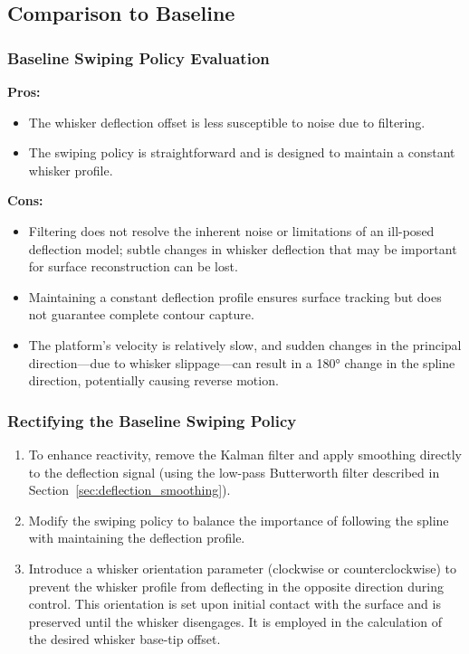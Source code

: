 \subsection{Comparison to Baseline}

\subsubsection{Baseline Swiping Policy Evaluation}

\textbf{Pros:}
\begin{itemize}
    \item The whisker deflection offset is less susceptible to noise due to filtering.
    \item The swiping policy is straightforward and is designed to maintain a constant whisker profile.
\end{itemize}

\textbf{Cons:}
\begin{itemize}
    \item Filtering does not resolve the inherent noise or limitations of an ill-posed deflection model; subtle changes in whisker deflection that may be important for surface reconstruction can be lost.
    \item Maintaining a constant deflection profile ensures surface tracking but does not guarantee complete contour capture.
    \item The platform's velocity is relatively slow, and sudden changes in the principal direction—due to whisker slippage—can result in a 180° change in the spline direction, potentially causing reverse motion.
\end{itemize}

\subsubsection{Rectifying the Baseline Swiping Policy}
\begin{enumerate}
    \item To enhance reactivity, remove the Kalman filter and apply smoothing directly to the deflection signal (using the low-pass Butterworth filter described in Section~\ref{sec:deflection_smoothing}).
    \item Modify the swiping policy to balance the importance of following the spline with maintaining the deflection profile.
    \item Introduce a whisker orientation parameter (clockwise or counterclockwise) to prevent the whisker profile from deflecting in the opposite direction during control.
    This orientation is set upon initial contact with the surface and is preserved until the whisker disengages.
    It is employed in the calculation of the desired whisker base-tip offset.
\end{enumerate}

